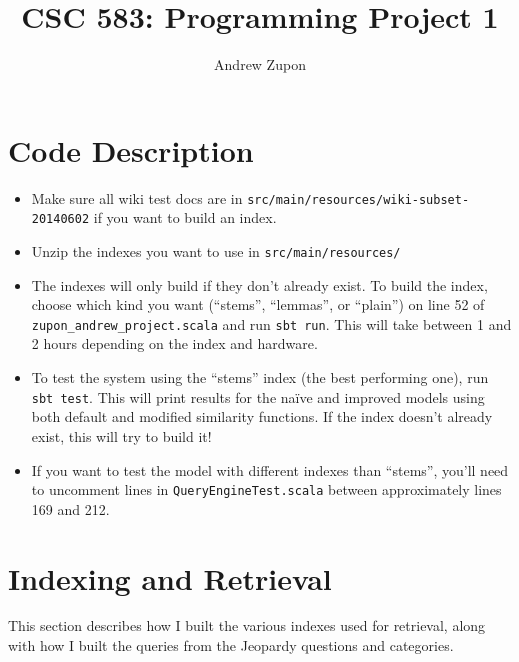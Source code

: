 \documentclass[11pt,letterpaper]{article}
\title{CSC 583: Programming Project 1}
\author{Andrew Zupon \\
}
\date{}
\begin{document}
	\maketitle
	

\section{Code Description}

\begin{itemize}
	\item Make sure all wiki test docs are in \texttt{src/main/resources/wiki-subset- 20140602} if you want to build an index.
	
	\item Unzip the indexes you want to use in \texttt{src/main/resources/}
	
	\item The indexes will only build if they don't already exist. To build the index, choose which kind you want (``stems'', ``lemmas'', or ``plain'') on line 52 of \texttt{zupon\_andrew\_project.scala} and run \texttt{sbt run}. This will take between 1 and 2 hours depending on the index and hardware.
	
	\item To test the system using the ``stems'' index (the best performing one), run \texttt{sbt test}. This will print results for the na\"ive and improved models using both default and modified similarity functions. If the index doesn't already exist, this will try to build it!
	
	\item If you want to test the model with different indexes than ``stems'', you'll need to uncomment lines in \texttt{QueryEngineTest.scala} between approximately lines 169 and 212.
\end{itemize}
	
	
\section{Indexing and Retrieval}
This section describes how I built the various indexes used for retrieval, along with how I built the queries from the Jeopardy questions and categories.
\end{document}
